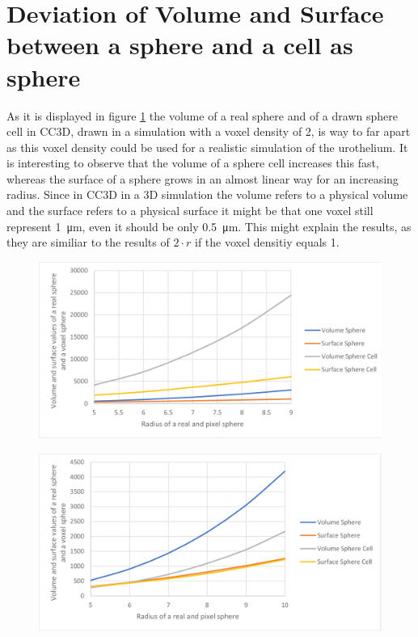 \section{Deviation of Volume and Surface between a sphere and a cell as sphere}
As it is displayed in figure \ref{img:DeviationSphereCellRealSphere-vD2} the volume of a real sphere and of a drawn sphere cell in \ac{CC3D}, drawn in a simulation with a voxel density of 2, is way to far apart as this voxel density could be used for a realistic simulation of the urothelium. It is interesting to observe that the volume of a sphere cell increases this fast, whereas the surface of a sphere grows in an almost linear way for an increasing radius. Since in \ac{CC3D} in a 3D simulation the volume refers to a physical volume and the surface refers to a physical surface it might be that one voxel still represent \SI{1}{\micro\metre}, even it should be only \SI{0.5}{\micro\metre}. This might explain the results, as they are similiar to the results of $2 \cdot r$ if the voxel densitiy equals 1.
\begin{figure}
	\center
	\includegraphics[scale=0.3]{figures/DeviationSphereToPixelSphere-vD2.png}
	\caption{}
	\label{img:DeviationSphereCellRealSphere-vD2}
\end{figure}

\begin{figure}
	\center
	\includegraphics[scale=0.3]{figures/DeviationSphereToPixelSphere-vD0_8.png}
	\caption{}
	\label{img:DeviationSphereCellRealSphere-vD0,8}
\end{figure}

